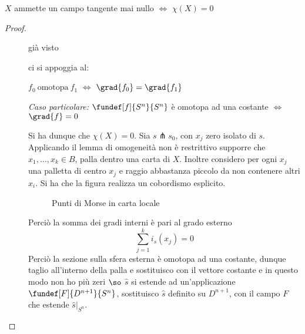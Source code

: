 

\begin{teo}
$X$ ammette un campo tangente mai nullo $\iff$ $\chi(X) = 0$
\end{teo}

\begin{proof}
~
	\begin{description}
		\item[\proofrightarrow]
		già visto		
		\item[\proofleftarrow]
		ci si appoggia al:
		\begin{teo}
		$f_0~\text{omotopa}~f_1$ $\iff$ $\grad{f_0} = \grad{f_1}$

		\emph{Caso particolare:} $\fundef[f]{S^n}{S^n}$ è omotopa ad una costante $\iff$ $\grad{f} = 0$
		\end{teo}
		Si ha dunque che $\chi(X) = 0$. Sia $s \pitchfork s_0$, con $x_j$ zero isolato di $s$.
		Applicando il lemma di omogeneità non è restrittivo supporre che $x_1, \dots, x_k \in B$, palla dentro una carta di $X$.
		Inoltre considero per ogni $x_j$ una palletta di centro $x_j$ e raggio abbastanza piccolo da non contenere altri $x_i$.
		Si ha che la figura realizza un cobordismo esplicito.

		\begin{figure}[h]
		\centering
		
		\caption{Punti di Morse in carta locale}
		\end{figure}

		Perciò la somma dei gradi interni è pari al grado esterno
		\begin{equation}
		\sum_{j=1}^k i_s(x_j) = 0
		\end{equation}
		Perciò la sezione sulla sfera esterna è omotopa ad una costante, dunque taglio all'interno della palla e sostituisco con il 			vettore costante e in questo modo non  ho più zeri $\so$ $\hat{s}$ si estende ad un'applicazione $\fundef[F]{D^{n+1}}{S^n}$, 			sostituisco $\hat{s}$ definito su $D^{n+1}$, con il campo $F$ che estende $\hat{s}|_{S^n}$.
	\end{description}
\end{proof}

